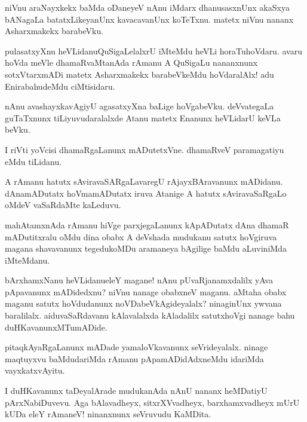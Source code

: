 \begin{mng}
niVnu araNayxkekx baMda oDaneyeV nAnu iMdarx dhanusasxnUnx akaSxya bANagaLa batatxLikeyanUnx kavacavanUnx koTeTxnu. matetx niVnu nananx Asharxmakekx barabeVku.
\end{mng}

\begin{mng}
pulasatxyXnu heVLidanu\mdash QuSigaLelalxrU iMteMdu heVLi horaTuhoVdaru. avaru hoVda meVle dhamaRvaMtanAda rAmanu A QuSigaLu nananxnunx sotxVtarxmADi matetx Asharxmakekx barabeVkeMdu hoVdaralAlx! adu EnirabahudeMdu ciMtisidaru.
\end{mng}

\begin{mng}
nAnu avashayxkavAgiyU agasatxyXna baLige hoVgabeVku. deVvategaLa guTaTxnunx tiLiyuvudaralalxde Atanu matetx Enanunx heVLidarU keVLa beVku.
\end{mng}

\begin{mng}
I riVti yoVcisi dhamaRgaLanunx mADutetxVne. dhamaRveV paramagatiyu eMdu tiLidanu.
\end{mng}

\begin{mng}
A rAmanu hatutx sAviravaSARgaLavaregU rAjayxBAravanunx mADidanu. dAnamADutatx hoVmamADutatx iruva Atanige A hatutx sAviravaSaRgaLo oMdeV vaSaRdaMte kaLeduvu.
\end{mng}

\begin{mng}
mahAtamxnAda rAmanu hiVge parxjegaLanunx kApADutatx dAna dhamaR mADutitxralu oMdu dina obabx A deVshada mudukanu satutx hoVgiruva magana shavavanunx tegedukoMDu aramaneya bAgilige baMdu aLuviniMda iMteMdanu.
\end{mng}

\begin{mng}
bArxhamxNanu heVLidanu\mdash eleY magane! nAnu pUvaRjanamxdalilx yAva pApavanunx mADidedxnu? niVnu nanage obabxneV maganu. aMtaha obabx maganu satutx hoVdudanunx noVDabeVkAgideyalalx? ninaginUnx ywvana baralilalx. aiduvaSaRdavanu kAlavalalxda kAladalilx satutxhoVgi nanage bahu duHKavanunxMTumADide.
\end{mng}

\begin{mng}
pitaqkAyaRgaLanunx mADade yamaloVkavanunx seVrideyalalx. ninage maqtuyxvu baMdudariMda rAmanu pApamADidAdxneMdu idariMda vayxkatxvAyitu.
\end{mng}

\begin{mng}
I duHKavanunx taDeyalArade mudukanAda nAnU nananx heMDatiyU pArxNabiDuvevu. Aga bAlavadheyx, sitxrXVvadheyx, barxhamxvadheyx mUrU kUDa eleY rAmaneV! ninanxnunx seVruvudu KaMDita.
\end{mng}


